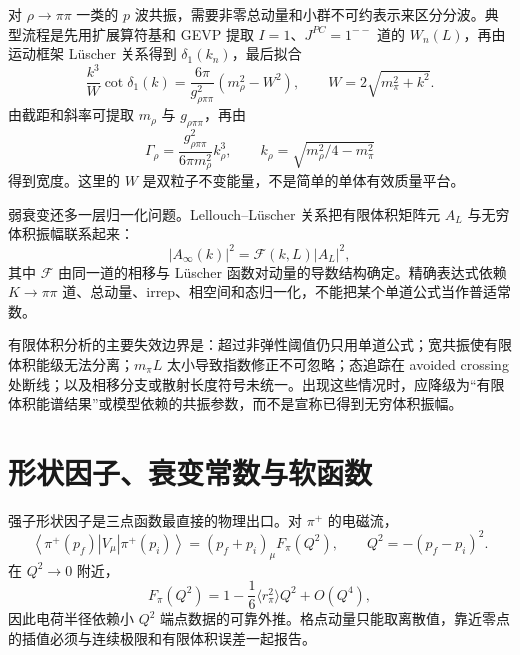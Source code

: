 对 \(\rho\to\pi\pi\) 一类的 \(p\) 波共振，需要非零总动量和小群不可约表示来区分分波。典型流程是先用扩展算符基和 GEVP 提取 \(I=1\)、\(J^{PC}=1^{--}\) 道的 \(W_n(L)\)，再由运动框架 Lüscher 关系得到 \(\delta_1(k_n)\)，最后拟合
\begin{equation}
  \frac{k^3}{W}\cot\delta_1(k)
  =\frac{6\pi}{g_{\rho\pi\pi}^2}
  \left(m_\rho^2-W^2\right),
  \qquad
  W=2\sqrt{m_\pi^2+k^2}.
  \label{eq:b02-rho-bw}
\end{equation}
由截距和斜率可提取 \(m_\rho\) 与 \(g_{\rho\pi\pi}\)，再由
\begin{equation}
  \Gamma_\rho
  =\frac{g_{\rho\pi\pi}^2}{6\pi m_\rho^2}k_\rho^3,
  \qquad
  k_\rho=\sqrt{m_\rho^2/4-m_\pi^2}
  \label{eq:b02-rho-width}
\end{equation}
得到宽度。这里的 \(W\) 是双粒子不变能量，不是简单的单体有效质量平台。

弱衰变还多一层归一化问题。Lellouch--Lüscher 关系把有限体积矩阵元 \(A_L\) 与无穷体积振幅联系起来：
\begin{equation}
  \left|A_\infty(k)\right|^2
  =\mathcal F(k,L)\left|A_L\right|^2,
  \label{eq:b02-ll}
\end{equation}
其中 \(\mathcal F\) 由同一道的相移与 Lüscher 函数对动量的导数结构确定。精确表达式依赖 \(K\to\pi\pi\) 道、总动量、irrep、相空间和态归一化，不能把某个单道公式当作普适常数。

有限体积分析的主要失效边界是：超过非弹性阈值仍只用单道公式；宽共振使有限体积能级无法分离；\(m_\pi L\) 太小导致指数修正不可忽略；态追踪在 avoided crossing 处断线；以及相移分支或散射长度符号未统一。出现这些情况时，应降级为“有限体积能谱结果”或模型依赖的共振参数，而不是宣称已得到无穷体积振幅。

\section{形状因子、衰变常数与软函数}\label{subsec:b02-form-factors}

强子形状因子是三点函数最直接的物理出口。对 \(\pi^+\) 的电磁流，
\begin{equation}
  \left\langle\pi^+(p_f)|V_\mu|\pi^+(p_i)\right\rangle
  =(p_f+p_i)_\mu F_\pi(Q^2),
  \qquad
  Q^2=-(p_f-p_i)^2.
  \label{eq:b02-pion-ff}
\end{equation}
在 \(Q^2\to0\) 附近，
\begin{equation}
  F_\pi(Q^2)
  =1-\frac16\langle r_\pi^2\rangle Q^2+O(Q^4),
  \label{eq:b02-charge-radius}
\end{equation}
因此电荷半径依赖小 \(Q^2\) 端点数据的可靠外推。格点动量只能取离散值，靠近零点的插值必须与连续极限和有限体积误差一起报告。

